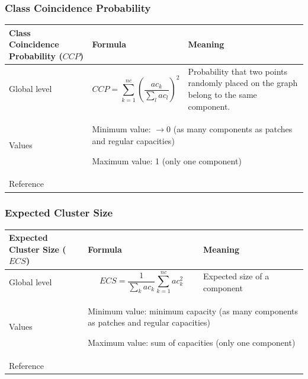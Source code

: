 \documentclass{article}
\begin{document}
\subsubsection{Class Coincidence Probability}
\label{metric_CCP}
\begin{table}[H]
\begin{tabular}{|m{3.24cm}|m{4.4810004cm}m{7.924cm}|}
\hline
Class Coincidence Probability
($CCP$) &
\multicolumn{1}{m{4.4810004cm}|}{Formula} &
Meaning\\\hline
Global level &
\multicolumn{1}{m{4.4810004cm}|}{\begin{equation*}
\mathit{CCP}=\sum
_{k=1}^{\mathit{nc}}{{\left(\frac{{\mathit{ac}}_{k}}{\sum
_{l}{{\mathit{ac}}_{l}}}\right)}^{2}}
\end{equation*}
} &
Probability that two points randomly placed on the
graph belong to the same component.\\\hline
Values &
\multicolumn{2}{m{12.6050005cm}|}{Minimum value: $\rightarrow 0$ (as many components as patches and regular capacities)

Maximum value: 1 (only one component)

}\\\hline
Reference &
\multicolumn{2}{m{12.6050005cm}|}{\cite{Pascual2006}}\\\hline
\end{tabular}
\end{table}


\subsubsection{Expected Cluster Size}
\label{metric_ECS}
\begin{table}[H]
\begin{tabular}{|m{3.24cm}|m{4.4810004cm}m{7.924cm}|}
\hline
Expected Cluster Size ($ECS$) &
\multicolumn{1}{m{4.4810004cm}|}{Formula} &
Meaning\\\hline
Global level &
\multicolumn{1}{m{4.4810004cm}|}{\begin{equation*}
\mathit{ECS}=\frac{1}{\sum _{k}{{\mathit{ac}}_{k}}}\sum
_{k=1}^{\mathit{nc}}{{{\mathit{ac}}_{k}^{2}}}
\end{equation*}
} &
Expected size of a component 

\\\hline
Values &
\multicolumn{2}{m{12.6050005cm}|}{Minimum value: minimum capacity (as many components as patches and regular capacities)

Maximum value: sum of capacities (only one component)

}\\\hline
Reference &
\multicolumn{2}{m{12.6050005cm}|}{\cite{OBrien2006}}\\\hline
\end{tabular}
\end{table}
\end{document}
